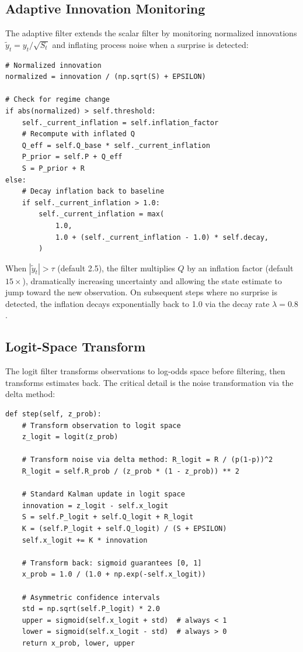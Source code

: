 \documentclass[11pt, a4paper]{article}
\begin{document}
\subsection{Adaptive Innovation Monitoring}

The adaptive filter extends the scalar filter by monitoring normalized innovations $\tilde{y}_t = y_t / \sqrt{S_t}$ and inflating process noise when a surprise is detected:

\begin{lstlisting}[style=python, caption={Regime detection and Q inflation in the adaptive filter (\texttt{adaptive\_kalman.py}).}]
# Normalized innovation
normalized = innovation / (np.sqrt(S) + EPSILON)

# Check for regime change
if abs(normalized) > self.threshold:
    self._current_inflation = self.inflation_factor
    # Recompute with inflated Q
    Q_eff = self.Q_base * self._current_inflation
    P_prior = self.P + Q_eff
    S = P_prior + R
else:
    # Decay inflation back to baseline
    if self._current_inflation > 1.0:
        self._current_inflation = max(
            1.0,
            1.0 + (self._current_inflation - 1.0) * self.decay,
        )
\end{lstlisting}

When $|\tilde{y}_t| > \tau$ (default 2.5), the filter multiplies $Q$ by an inflation factor (default $15\times$), dramatically increasing uncertainty and allowing the state estimate to jump toward the new observation. On subsequent steps where no surprise is detected, the inflation decays exponentially back to 1.0 via the decay rate $\lambda = 0.8$.

\subsection{Logit-Space Transform}

The logit filter transforms observations to log-odds space before filtering, then transforms estimates back. The critical detail is the noise transformation via the delta method:

\begin{lstlisting}[style=python, caption={Logit-space filtering with delta method noise transform (\texttt{logit\_kalman.py}).}]
def step(self, z_prob):
    # Transform observation to logit space
    z_logit = logit(z_prob)

    # Transform noise via delta method: R_logit = R / (p(1-p))^2
    R_logit = self.R_prob / (z_prob * (1 - z_prob)) ** 2

    # Standard Kalman update in logit space
    innovation = z_logit - self.x_logit
    S = self.P_logit + self.Q_logit + R_logit
    K = (self.P_logit + self.Q_logit) / (S + EPSILON)
    self.x_logit += K * innovation

    # Transform back: sigmoid guarantees [0, 1]
    x_prob = 1.0 / (1.0 + np.exp(-self.x_logit))

    # Asymmetric confidence intervals
    std = np.sqrt(self.P_logit) * 2.0
    upper = sigmoid(self.x_logit + std)  # always < 1
    lower = sigmoid(self.x_logit - std)  # always > 0
    return x_prob, lower, upper
\end{lstlisting}
\end{document}
